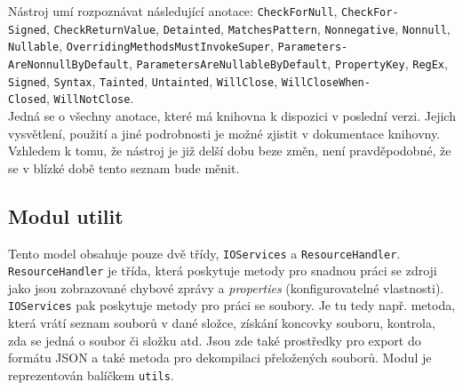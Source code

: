 				Nástroj umí rozpoznávat následující anotace: \texttt{CheckForNull}, \texttt{CheckFor-}\\\texttt{Signed}, \texttt{CheckReturnValue}, \texttt{Detainted}, \texttt{MatchesPattern}, \texttt{Nonnegative}, \texttt{Nonnull}, \texttt{Nullable}, \texttt{OverridingMethodsMustInvokeSuper}, \texttt{Parameters-}\\\texttt{AreNonnullByDefault}, \texttt{ParametersAreNullableByDefault}, \texttt{PropertyKey}, \texttt{RegEx}, \texttt{Signed}, \texttt{Syntax}, \texttt{Tainted}, \texttt{Untainted}, \texttt{WillClose}, \texttt{WillCloseWhen-}\\\texttt{Closed}, \texttt{WillNotClose}.\\
				
				Jedná se o všechny anotace, které má knihovna k dispozici v poslední verzi. Jejich vysvětlení, použití a jiné podrobnosti je možné zjistit v dokumentace knihovny. Vzhledem k tomu, že nástroj je již delší dobu beze změn, není pravděpodobné, že se v blízké době tento seznam bude měnit. 
			
		

		
		\subsection{Modul utilit}	
			Tento model obsahuje pouze dvě třídy, \texttt{IOServices} a \texttt{ResourceHandler}. \texttt{ResourceHandler} je třída, která poskytuje metody pro snadnou práci se zdroji jako jsou zobrazované chybové zprávy a \emph{properties} (konfigurovatelné vlastnosti). \texttt{IOServices} pak poskytuje metody pro práci se soubory. Je tu tedy např. metoda, která vrátí seznam souborů v dané složce, získání koncovky souboru, kontrola, zda se jedná o soubor či složku atd. Jsou zde také prostředky pro export do formátu JSON a také metoda pro dekompilaci přeložených souborů. Modul je reprezentován balíčkem \texttt{utils}.
		
